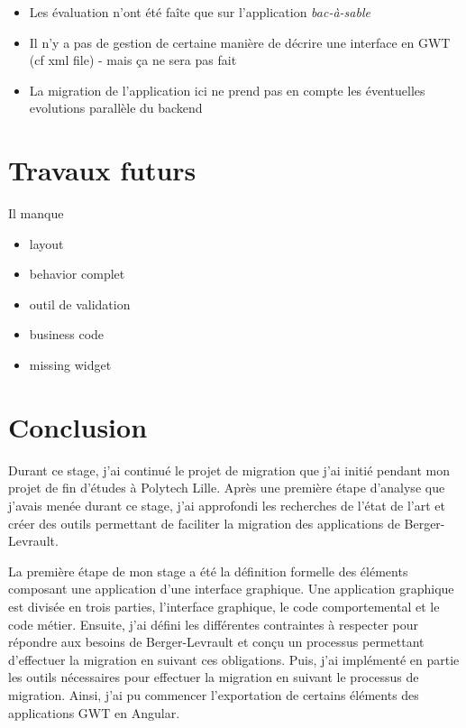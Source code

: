\documentclass[11pt,]{article}
\providecommand{\tightlist}{%
  \setlength{\itemsep}{0pt}\setlength{\parskip}{0pt}}
\begin{document}
\begin{itemize}
\tightlist
\item
  Les évaluation n'ont été faîte que sur l'application
  \emph{bac-à-sable}
\item
  Il n'y a pas de gestion de certaine manière de décrire une interface
  en GWT (cf xml file) - mais ça ne sera pas fait
\item
  La migration de l'application ici ne prend pas en compte les
  éventuelles evolutions parallèle du backend
\end{itemize}

\newpage

\hypertarget{travaux-futurs}{%
\section{Travaux futurs}\label{travaux-futurs}}

Il manque

\begin{itemize}
\tightlist
\item
  layout
\item
  behavior complet
\item
  outil de validation
\item
  business code
\item
  missing widget
\end{itemize}

\newpage

\hypertarget{conclusion}{%
\section{Conclusion}\label{conclusion}}

Durant ce stage, j'ai continué le projet de migration que j'ai initié
pendant mon projet de fin d'études à Polytech Lille. Après une première
étape d'analyse que j'avais menée durant ce stage, j'ai approfondi les
recherches de l'état de l'art et créer des outils permettant de
faciliter la migration des applications de Berger-Levrault.

La première étape de mon stage a été la définition formelle des éléments
composant une application d'une interface graphique. Une application
graphique est divisée en trois parties, l'interface graphique, le code
comportemental et le code métier. Ensuite, j'ai défini les différentes
contraintes à respecter pour répondre aux besoins de Berger-Levrault et
conçu un processus permettant d'effectuer la migration en suivant ces
obligations. Puis, j'ai implémenté en partie les outils nécessaires pour
effectuer la migration en suivant le processus de migration. Ainsi, j'ai
pu commencer l'exportation de certains éléments des applications GWT en
Angular.
\end{document}
